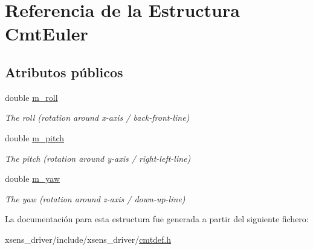 \hypertarget{structCmtEuler}{\section{\-Referencia de la \-Estructura \-Cmt\-Euler}
\label{structCmtEuler}
}
\subsection*{\-Atributos públicos}
\begin{DoxyCompactItemize}
\item 
\hypertarget{structCmtEuler_a70d8b2c176cb2186a0f9b4b096619a9c}{double \hyperlink{structCmtEuler_a70d8b2c176cb2186a0f9b4b096619a9c}{m\-\_\-roll}}\label{structCmtEuler_a70d8b2c176cb2186a0f9b4b096619a9c}

\begin{DoxyCompactList}\small\item\em \-The roll (rotation around x-\/axis / back-\/front-\/line) \end{DoxyCompactList}\item 
\hypertarget{structCmtEuler_a34d39a6b6e67999a4868b6f5c8ee1c7b}{double \hyperlink{structCmtEuler_a34d39a6b6e67999a4868b6f5c8ee1c7b}{m\-\_\-pitch}}\label{structCmtEuler_a34d39a6b6e67999a4868b6f5c8ee1c7b}

\begin{DoxyCompactList}\small\item\em \-The pitch (rotation around y-\/axis / right-\/left-\/line) \end{DoxyCompactList}\item 
\hypertarget{structCmtEuler_a1f045d4cf153b58c0c7a54f2f08fe987}{double \hyperlink{structCmtEuler_a1f045d4cf153b58c0c7a54f2f08fe987}{m\-\_\-yaw}}\label{structCmtEuler_a1f045d4cf153b58c0c7a54f2f08fe987}

\begin{DoxyCompactList}\small\item\em \-The yaw (rotation around z-\/axis / down-\/up-\/line) \end{DoxyCompactList}\end{DoxyCompactItemize}


\-La documentación para esta estructura fue generada a partir del siguiente fichero\-:\begin{DoxyCompactItemize}
\item 
xsens\-\_\-driver/include/xsens\-\_\-driver/\hyperlink{cmtdef_8h}{cmtdef.\-h}\end{DoxyCompactItemize}
